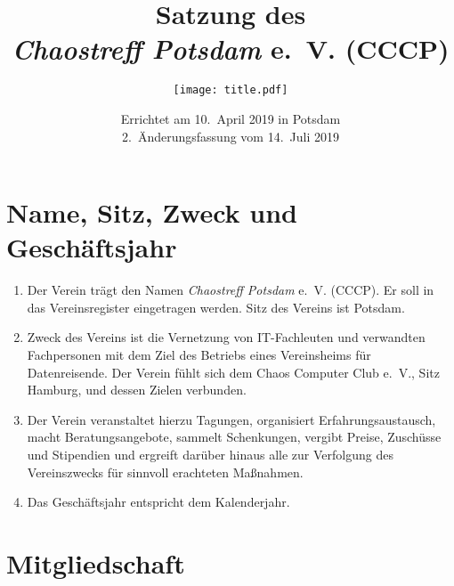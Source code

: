 \documentclass[a4paper, 10pt, headings=normal]{scrartcl}
\title{Satzung des \\ \emph{Chaostreff Potsdam} e.~V. (CCCP)}
\author{\texttt{[image: title.pdf]}}
\date{Errichtet am 10.~April 2019 in Potsdam \\ 2.~Änderungsfassung vom 14.~Juli 2019}
\begin{document}
\maketitle
\pagestyle{myheadings}

\begin{multicols}{2}

\section{Name, Sitz, Zweck und Geschäftsjahr}
\label{par:name-sitz-zweck}

\begin{enumerate}[label={(\arabic*)}]
	\item
		Der Verein trägt den Namen \emph{Chaostreff Potsdam} e.~V. (CCCP).
		Er soll in das Vereinsregister eingetragen werden.
		Sitz des Vereins ist Potsdam.
	\item
		Zweck des Vereins ist die Vernetzung von IT-Fachleuten und verwandten Fachpersonen mit dem Ziel des Betriebs eines Vereinsheims für Datenreisende.
		Der Verein fühlt sich dem Chaos Computer Club e.~V., Sitz Hamburg, und dessen Zielen verbunden.
	\item
		Der Verein veranstaltet hierzu Tagungen, organisiert Erfahrungsaustausch, macht Beratungsangebote, sammelt Schenkungen, vergibt Preise, Zuschüsse und Stipendien und ergreift darüber hinaus alle zur Verfolgung des Vereinszwecks für sinnvoll erachteten Maßnahmen.
	\item
		Das Geschäftsjahr entspricht dem Kalenderjahr.
\end{enumerate}

\section{Mitgliedschaft}
\label{par:mitgliedschaft}


\end{multicols}
\end{document}
